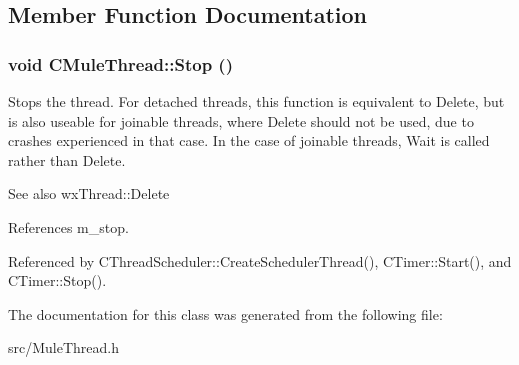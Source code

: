 \subsection{Member Function Documentation}
\subsubsection[{Stop}]{\setlength{\rightskip}{0pt plus 5cm}void CMuleThread::Stop ()\hspace{0.3cm}{\ttfamily  [inline]}}\label{classCMuleThread_a96c93ce2d01a8ff636bac99b851f0053}


Stops the thread. For detached threads, this function is equivalent to Delete, but is also useable for joinable threads, where Delete should not be used, due to crashes experienced in that case. In the case of joinable threads, Wait is called rather than Delete.

\begin{DoxySeeAlso}{See also}
wxThread::Delete 
\end{DoxySeeAlso}


References m\_\-stop.

Referenced by CThreadScheduler::CreateSchedulerThread(), CTimer::Start(), and CTimer::Stop().

The documentation for this class was generated from the following file:\begin{DoxyCompactItemize}
\item 
src/MuleThread.h\end{DoxyCompactItemize}
